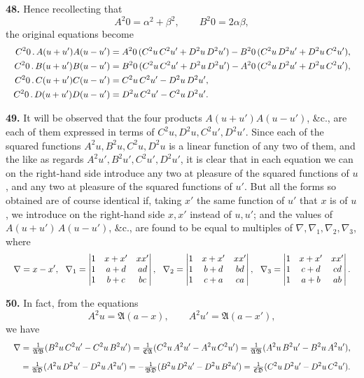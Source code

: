 \documentclass[11pt]{article}
\newcommand{\Ag}{\mathfrak{A}}
\newcommand{\Bg}{\mathfrak{B}}
\newcommand{\Cg}{\mathfrak{C}}
\newcommand{\Dg}{\mathfrak{D}}
\begin{document}
\medskip
\textbf{48.} Hence recollecting that
\[
A^2 0 = \alpha^2 + \beta^2,\qquad B^2 0 = 2\alpha\beta,
\]
the original equations become
\[
\resizebox{\textwidth}{!}{$\displaystyle
\begin{aligned}
C^2 0\,.\,A(u+u')A(u-u') &= A^2 0\,(C^2 u\,C^2 u' + D^2 u\,D^2 u') - B^2 0\,(C^2 u\,D^2 u' + D^2 u\,C^2 u'),\\
C^2 0\,.\,B(u+u')B(u-u') &= B^2 0\,(C^2 u\,C^2 u' + D^2 u\,D^2 u') - A^2 0\,(C^2 u\,D^2 u' + D^2 u\,C^2 u'),\\
C^2 0\,.\,C(u+u')C(u-u') &= C^2 u\,C^2 u' - D^2 u\,D^2 u',\\
C^2 0\,.\,D(u+u')D(u-u') &= D^2 u\,C^2 u' - C^2 u\,D^2 u'.
\end{aligned}$}
\]

\medskip
\textbf{49.} It will be observed that the four products $A(u+u')A(u-u')$, \&c., are each of them expressed in terms of $C^2 u, D^2 u, C^2 u', D^2 u'$. Since each of the squared functions $A^2 u, B^2 u, C^2 u, D^2 u$ is a linear function of any two of them, and the like as regards $A^2 u', B^2 u', C^2 u', D^2 u'$, it is clear that in each equation we can on the right-hand side introduce any two at pleasure of the squared functions of $u$, and any two at pleasure of the squared functions of $u'$. But all the forms so obtained are of course identical if, taking $x'$ the same function of $u'$ that $x$ is of $u$, we introduce on the right-hand side $x, x'$ instead of $u, u'$; and the values of $A(u+u')\,A(u-u')$, \&c., are found to be equal to multiples of $\nabla,\nabla_1,\nabla_2,\nabla_3$, where
\[
\resizebox{\textwidth}{!}{$\displaystyle
\nabla = x-x',\ \ \nabla_1 = \begin{vmatrix}1 & x+x' & xx'\\ 1 & a+d & ad\\ 1 & b+c & bc\end{vmatrix},\ \ \nabla_2 = \begin{vmatrix}1 & x+x' & xx'\\ 1 & b+d & bd\\ 1 & c+a & ca\end{vmatrix},\ \ \nabla_3 = \begin{vmatrix}1 & x+x' & xx'\\ 1 & c+d & cd\\ 1 & a+b & ab\end{vmatrix}.
$}
\]

\medskip
\textbf{50.} In fact, from the equations
\[
A^2 u = \Ag(a-x),\qquad A^2 u' = \Ag(a-x'),
\]
we have
\[
\resizebox{\textwidth}{!}{$\displaystyle
\nabla = \tfrac{1}{\Ag\Bg}(B^2 u\,C^2 u' - C^2 u\,B^2 u') = \tfrac{1}{\Cg\Ag}(C^2 u\,A^2 u' - A^2 u\,C^2 u') = \tfrac{1}{\Ag\Bg}(A^2 u\,B^2 u' - B^2 u\,A^2 u'),
$}
\]
\[
\resizebox{\textwidth}{!}{$\displaystyle
\phantom{\nabla} = \tfrac{1}{\Ag\Dg}(A^2 u\,D^2 u' - D^2 u\,A^2 u') = -\tfrac{1}{\Bg\Dg}(B^2 u\,D^2 u' - D^2 u\,B^2 u') = \tfrac{1}{\Cg\Dg}(C^2 u\,D^2 u' - D^2 u\,C^2 u').
$}
\]
\end{document}
